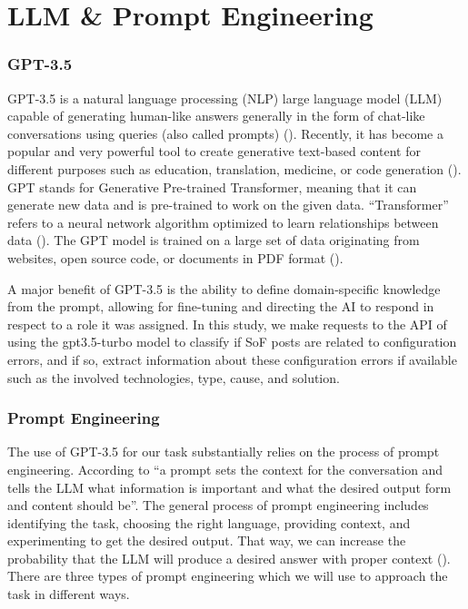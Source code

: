 \documentclass[english,bachelor]{swsLeipzig}
\begin{document}
\section{LLM \& Prompt Engineering}
\subsubsection{GPT-3.5}
GPT-3.5 is a natural language processing (NLP) large language model (LLM) capable of generating human-like answers 
generally in the form of chat-like conversations using queries (also called prompts) (\citet{bahrini:2023}). Recently, it has become a popular and very powerful tool to create generative text-based content for different purposes such as education, translation, medicine, or code generation (\citet{liu:2023}). GPT stands for Generative Pre-trained Transformer, meaning that it can generate new data and is pre-trained to work on the given data. ``Transformer'' refers to a neural network algorithm optimized to learn relationships between data (\citet{perrigo:2023}). The GPT model is trained on a large set of data originating from websites, open source code, or documents in PDF format (\citet{bahrini:2023}).

A major benefit of GPT-3.5 is the ability to define domain-specific knowledge from the prompt, allowing for fine-tuning 
and directing the AI to respond in respect to a role it was assigned. In this study, we make requests to the API of \citeauthor{openai:2023} using the gpt3.5-turbo model to classify if SoF posts are related to configuration errors, and if so, extract information about these configuration errors if available such as the involved technologies, type, cause, and solution.

\subsubsection{Prompt Engineering}\label{sec:pe}
The use of GPT-3.5 for our task substantially relies on the process of prompt engineering. According to \citet{white:2023} ``a prompt sets the context for the conversation and tells the LLM what information is important and what the desired output form and content should be''. The general process of prompt engineering includes identifying the task, choosing the right language, providing context, and experimenting to get the desired output. That way, we can increase the probability that the LLM will produce a desired answer with proper context (\citet{reynolds:2021}). There are three types of prompt engineering which we will use to approach the task in different ways.
\end{document}
